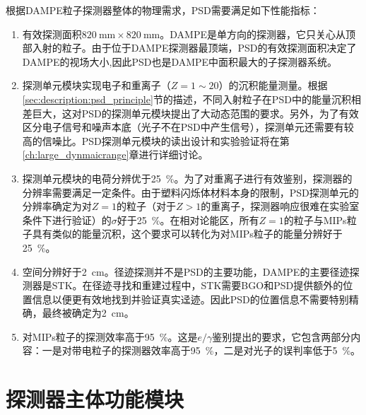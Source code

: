 根据DAMPE粒子探测器整体的物理需求，PSD需要满足如下性能指标：
\begin{enumerate}[noitemsep,topsep=0pt]
	\item 有效探测面积$\SI{820}{\milli\meter}\times\SI{820}{\milli\meter}$。DAMPE是单方向的探测器，它只关心从顶部入射的粒子。由于位于DAMPE探测器最顶端，PSD的有效探测面积决定了DAMPE的视场大小,因此PSD也是DAMPE中面积最大的子探测器系统。
	\item 探测单元模块实现电子和重离子（$Z=1\sim20$）的沉积能量测量。根据\ref{sec:description:psd_principle}节的描述，不同入射粒子在PSD中的能量沉积相差巨大，这对PSD的探测单元模块提出了大动态范围的要求。另外，为了有效区分电子信号和噪声本底（光子不在PSD中产生信号），探测单元还需要有较高的信噪比。PSD探测单元模块的读出设计和实验验证将在第\ref{ch:large_dynmaicrange}章进行详细讨论。
	\item 探测单元模块的电荷分辨优于\SI{25}{\percent}。为了对重离子进行有效鉴别，探测器的分辨率需要满足一定条件。由于塑料闪烁体材料本身的限制，PSD探测单元的分辨率确定为对$Z=1$的粒子（对于$Z>1$的重离子，探测器响应很难在实验室条件下进行验证）的$\sigma$好于\SI{25}{\percent}。在相对论能区，所有$Z=1$的粒子与MIPs粒子具有类似的能量沉积，这个要求可以转化为对MIPs粒子的能量分辨好于\SI{25}{\percent}。
	\item 空间分辨好于\SI{2}{\centi\meter}。径迹探测并不是PSD的主要功能，DAMPE的主要径迹探测器是STK。在径迹寻找和重建过程中，STK需要BGO和PSD提供额外的位置信息以便更有效地找到并验证真实迳迹。因此PSD的位置信息不需要特别精确，最终被确定为\SI{2}{\centi\meter}。
	\item 对MIPs粒子的探测效率高于\SI{95}{\percent}。这是$e/\gamma$鉴别提出的要求，它包含两部分内容：一是对带电粒子的探测器效率高于\SI{95}{\percent}，二是对光子的误判率低于\SI{5}{\percent}。
\end{enumerate}

\section{探测器主体功能模块}

